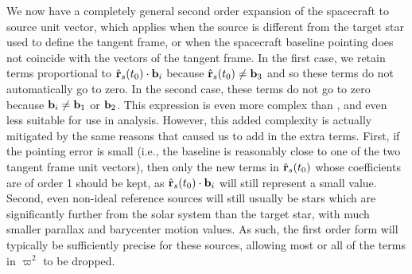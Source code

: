 We now have a completely general second order expansion of the spacecraft to source unit vector, which applies when the source is different from the target star used to define the tangent frame, or when the spacecraft baseline pointing does not coincide with the vectors of the tangent frame.  In the first case, we retain terms proportional to $\hat{\mathbf{r}}_s(t_0) \cdot \mathbf b_i$ because $\hat{\mathbf{r}}_s(t_0) \ne \mathbf b_3$ and so these terms do not automatically go to zero.  In the second case, these terms do not go to zero because $\mathbf b_i \ne \mathbf b_1$ or $\mathbf b_2$.  This expression is even more complex than , and even less suitable for use in analysis.  However, this added complexity is actually mitigated by the same reasons that caused us to add in the extra terms.  First, if the pointing error is small (i.e., the baseline is reasonably close to one of the two tangent frame unit vectors), then only the new terms in $\hat{\mathbf{r}}_s(t_0)$ whose coefficients are of order 1 should be kept, as $\hat{\mathbf{r}}_s(t_0) \cdot \mathbf b_i$ will still represent a small value.  Second, even non-ideal reference sources will still usually be stars which are significantly further from the solar system than the target star, with much smaller parallax and barycenter motion values.  As such, the first order form will typically be sufficiently precise for these sources, allowing most or all of the terms in $\varpi^2$ to be dropped.

